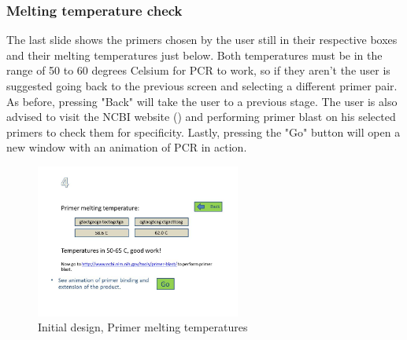 \subsubsection{Melting temperature check}
The last slide shows the primers chosen by the user still in their respective boxes and their melting temperatures just below. Both temperatures must be in the range of 50 to 60 degrees Celsium for PCR to work, so if they aren't the user is suggested going back to the previous screen and selecting a different primer pair. As before, pressing "Back" will take the user to a previous stage. The user is also advised to visit the NCBI website (\cite{ncbi}) and performing primer blast on his selected primers to check them for specificity. Lastly, pressing the "Go" button will open a new window with an animation of PCR in action.

\begin{figure}[h]
  \begin{center}
	\includegraphics[width=0.6\textwidth]{./images/UiDes/Slide6.JPG}
    \caption{
      \label{fig:UiDes:slide6}
      Initial design, Primer melting temperatures
    }
  \end{center}
\end{figure}

